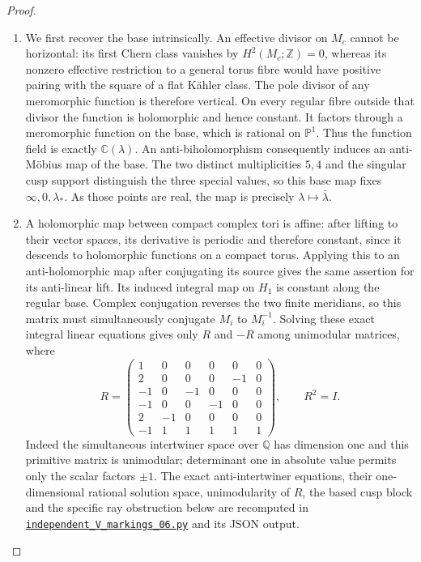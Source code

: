 \begin{proof}
\begin{enumerate}[label={$\langle1\rangle$\arabic*.}]
\item We first recover the base intrinsically.  An effective divisor on
$M_c$ cannot be horizontal: its first Chern class vanishes by
$H^2(M_c;\mathbb Z)=0$, whereas its nonzero effective restriction to a
general torus fibre would have positive pairing with the square of a
flat K\"ahler class.  The pole divisor of any meromorphic function is
therefore vertical.  On every regular fibre outside that divisor the
function is holomorphic and hence constant.  It factors through a
meromorphic function on the base, which is rational on
$\mathbb P^1$.  Thus the function field is exactly $\mathbb C(\lambda)$.
An anti-biholomorphism consequently induces an anti-M\"obius map of
the base.  The two distinct multiplicities $5,4$ and the singular cusp
support distinguish the three special values, so this base map fixes
$\infty,0,\lambda_*$.  As those points are real, the map is precisely
$\lambda\mapsto\bar\lambda$.

\item A holomorphic map between compact complex tori is affine: after
lifting to their vector spaces, its derivative is periodic and
therefore constant, since it descends to holomorphic functions on a
compact torus.  Applying this to an anti-holomorphic map after
conjugating its source gives the same assertion for its anti-linear
lift.  Its induced integral map on $H_1$ is constant along the
regular base.  Complex conjugation reverses the two finite meridians,
so this matrix must simultaneously conjugate $M_i$ to $M_i^{-1}$.
Solving these exact integral linear equations gives only $R$ and
$-R$ among unimodular matrices, where
\[
R=\begin{pmatrix}
1&0&0&0&0&0\\
2&0&0&0&-1&0\\
-1&0&-1&0&0&0\\
-1&0&0&-1&0&0\\
2&-1&0&0&0&0\\
-1&1&1&1&1&1
\end{pmatrix},\qquad R^2=I.
\]
Indeed the simultaneous intertwiner space over $\mathbb Q$ has
dimension one and this primitive matrix is unimodular; determinant
one in absolute value permits only the scalar factors $\pm1$.
The exact anti-intertwiner equations, their one-dimensional rational
solution space, unimodularity of $R$, the based cusp block and the
specific ray obstruction below are recomputed in
\href{https://github.com/KokunoYumeto/s6-complex-structure-workbench/blob/83d76022bcd442278b760db9ff438afceed6c6ea/pro_returns/S6_SERIES_GRIND_checkpoint_10_20261120T0211Z/code/current_audits/audit_corrections/code/independent_V_markings_06.py}{\texttt{independent\_V\_markings\_06.py}} and its JSON output.


\end{enumerate}
\end{proof}
